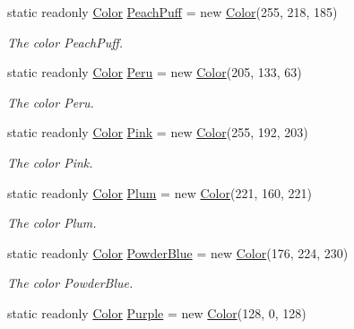 \begin{DoxyCompactItemize}
static readonly \hyperlink{struct_tri_devs_1_1_tri_engine2_d_1_1_color}{Color} \hyperlink{struct_tri_devs_1_1_tri_engine2_d_1_1_color_a945ef3c2c73d9788c0f597b443047368}{Peach\-Puff} = new \hyperlink{struct_tri_devs_1_1_tri_engine2_d_1_1_color}{Color}(255, 218, 185)
\begin{DoxyCompactList}\small\item\em The color Peach\-Puff. \end{DoxyCompactList}\item 
static readonly \hyperlink{struct_tri_devs_1_1_tri_engine2_d_1_1_color}{Color} \hyperlink{struct_tri_devs_1_1_tri_engine2_d_1_1_color_ad064a2b719a18264e047888e03ec54b6}{Peru} = new \hyperlink{struct_tri_devs_1_1_tri_engine2_d_1_1_color}{Color}(205, 133, 63)
\begin{DoxyCompactList}\small\item\em The color Peru. \end{DoxyCompactList}\item 
static readonly \hyperlink{struct_tri_devs_1_1_tri_engine2_d_1_1_color}{Color} \hyperlink{struct_tri_devs_1_1_tri_engine2_d_1_1_color_a6c34d2bdc0fce11be800fc64d0c60dc9}{Pink} = new \hyperlink{struct_tri_devs_1_1_tri_engine2_d_1_1_color}{Color}(255, 192, 203)
\begin{DoxyCompactList}\small\item\em The color Pink. \end{DoxyCompactList}\item 
static readonly \hyperlink{struct_tri_devs_1_1_tri_engine2_d_1_1_color}{Color} \hyperlink{struct_tri_devs_1_1_tri_engine2_d_1_1_color_a15319e839742ec663ec31fc4e89cdc59}{Plum} = new \hyperlink{struct_tri_devs_1_1_tri_engine2_d_1_1_color}{Color}(221, 160, 221)
\begin{DoxyCompactList}\small\item\em The color Plum. \end{DoxyCompactList}\item 
static readonly \hyperlink{struct_tri_devs_1_1_tri_engine2_d_1_1_color}{Color} \hyperlink{struct_tri_devs_1_1_tri_engine2_d_1_1_color_a68c74837201d0f1792ea4cb13ad57f6b}{Powder\-Blue} = new \hyperlink{struct_tri_devs_1_1_tri_engine2_d_1_1_color}{Color}(176, 224, 230)
\begin{DoxyCompactList}\small\item\em The color Powder\-Blue. \end{DoxyCompactList}\item 
static readonly \hyperlink{struct_tri_devs_1_1_tri_engine2_d_1_1_color}{Color} \hyperlink{struct_tri_devs_1_1_tri_engine2_d_1_1_color_aa6ad084d5ee3b55cf167d0558e514784}{Purple} = new \hyperlink{struct_tri_devs_1_1_tri_engine2_d_1_1_color}{Color}(128, 0, 128)

\end{DoxyCompactItemize}
